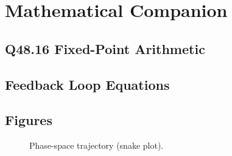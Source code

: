 
\chapter{Mathematical Companion}
\label{vol3:chap:math}


\section{Q48.16 Fixed-Point Arithmetic}
\label{vol3:sec:math:q4816}


\section{Feedback Loop Equations}
\label{vol3:sec:math:loops}


\section{Figures}
\label{vol3:sec:math:figures}


\begin{figure}[ht]
  \centering
  \caption{Phase-space trajectory (snake plot).}
  \label{fig:snake}
\end{figure}
